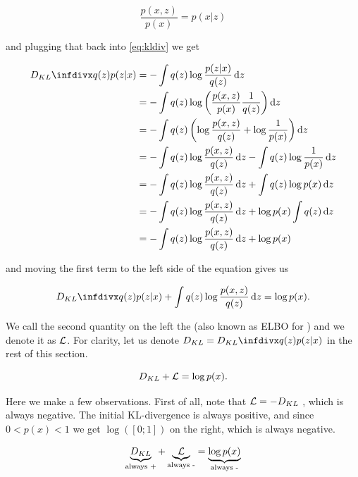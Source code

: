 \begin{equation}
    \frac{p(x,z)}{p(x)} = p(x|z)
\end{equation}

and plugging that back into \ref{eq:kldiv} we get

\begin{align}
    \kldiv{q(z)}{p(z|x)} &= - \int q(z) \log \frac{p(z|x)}{q(z)} \dz \\
    &= - \int q(z) \log \left( \frac{p(x,z)}{p(x)}  \frac{1}{q(z)} \right) \dz \\
    &= - \int q(z) \left( \log \frac{p(x,z)}{q(z)} + \log \frac{1}{p(x)} \right) \dz \\
    &= - \int q(z) \log \frac{p(x,z)}{q(z)} \dz - \int q(z) \log \frac{1}{p(x)} \dz \\
    &= - \int q(z) \log \frac{p(x,z)}{q(z)} \dz + \int q(z) \log p(x) \dz \\
    &= - \int q(z) \log \frac{p(x,z)}{q(z)} \dz + \log p(x) \int q(z) \dz \\
    &= - \int q(z) \log \frac{p(x,z)}{q(z)} \dz + \log p(x)
\end{align}

and moving the first term to the left side of the equation gives us

\begin{equation}
    \kldiv{q(z)}{p(z|x)} + \int q(z) \log \frac{p(x,z)}{q(z)} \dz = \log p(x).
\end{equation}

We call the second quantity on the left the  (also known as ELBO for ) and we denote it as ${\mathcal{L}}$. For clarity, let us denote $D_{KL} = \kldiv{q(z)}{p(z|x)}$ in the rest of this section.

\begin{equation}
    D_{KL} + {\mathcal{L}} = \log p(x).
\end{equation}

Here we make a few observations. First of all, note that ${\mathcal{L}} = -D_{KL}$ , which is always negative. The initial KL-divergence is always positive, and since $0 < p(x) < 1$  we get $\log ([0; 1])$ on the right, which is always negative.

\begin{equation}
    \underbrace{D_{KL}}_{\text{always +}} + \underbrace{{\mathcal{L}}}_{\text{always -}} = \underbrace{\log p(x)}_{\text{always -}}
\end{equation}

